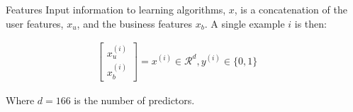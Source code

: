 \documentclass[final]{beamer}
\newlength{\sepwid}
\newlength{\firstcolwid}
\begin{document}
\begin{frame}[t]
\begin{columns}[t]
\begin{column}{\firstcolwid}
\begin{block}{Features}
    Input information to learning algorithms, $x$, is a concatenation of the user features, $x_u$, and the business features $x_b$. A single example $i$ is then:

\begin{align}
    \begin{bmatrix} x^{(i)}_u \\ x^{(i)}_b \end{bmatrix} = x^{(i)} \in \mathcal{R}^d,  y^{(i)} \in \{0, 1 \}
\end{align}

Where $d = 166$ is the number of predictors.
    \end{block}

\end{column}

\begin{column}{\sepwid}\end{column}


\end{columns}
\end{frame}
\end{document}
